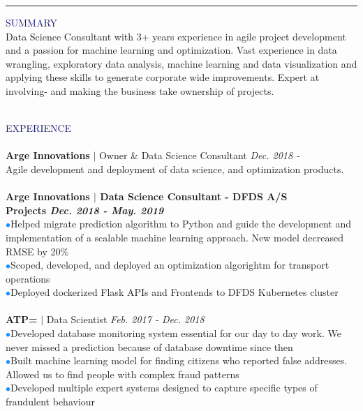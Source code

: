 \documentclass[10pt,a4paper]{article}
\newcommand{\newprojects}[3]{\\\textbf{#1}\\#2\\ \makebullet{#3}\\}
\newcommand{\headline}[1]{\Large \textcolor{midnightblue}{#1}}
\newcommand{\accomplishment}[1]{{\hspace*{-9pt}\textcolor{dodgerblue}{$\bullet$}}\hspace*{4pt}\linespread{1.1}\footnotesize#1}
\begin{document}
\vspace{0.5cm}
\hrule
\vspace{0.5cm}
{\headline{SUMMARY}}\\
Data Science Consultant with 3+ years experience in agile project development and a passion for machine learning and optimization. Vast experience in data wrangling, exploratory data analysis, machine learning and data visualization and applying these skills to generate corporate wide improvements. Expert at involving- and making the business take ownership of projects.\\
\vspace{0.3cm}
\\
  \begin{minipage}[t]{0.66\linewidth}
    {\headline{EXPERIENCE}}\\
    \vspace{-8pt}\\
    \textbf{Arge Innovations} $|$ Owner \& Data Science Consultant \hfill \textit{Dec. 2018 -} \\
    Agile development and deployment of data science, and optimization products.\\
    \newprojects{Arge Innovations $|$ Data Science Consultant - DFDS A/S \\ Projects \hfill \textmd{\textit{Dec. 2018 - May. 2019}}}%
        {%
            \accomplishment{Helped migrate prediction algorithm to Python and guide the development and implementation of a scalable machine learning approach. New model decreased RMSE by 20\%}\\%
            \accomplishment{Scoped, developed, and deployed an optimization algorightm for transport operations}\\%
            \accomplishment{Deployed dockerized Flask APIs and Frontends to DFDS Kubernetes cluster}%
        }{}
    \textbf{ATP=} $|$ Data Scientist \hfill \textit{Feb. 2017 - Dec. 2018} \\
    \accomplishment{Developed database monitoring system essential for our day to day work. We never missed a prediction because of database downtime since then}\\
    \accomplishment{Built machine learning model for finding citizens who reported false addresses. Allowed us to find people with complex fraud patterns}\\
    \accomplishment{Developed multiple expert systems designed to capture specific types of fraudulent behaviour}\\

\end{minipage}
\end{document}
